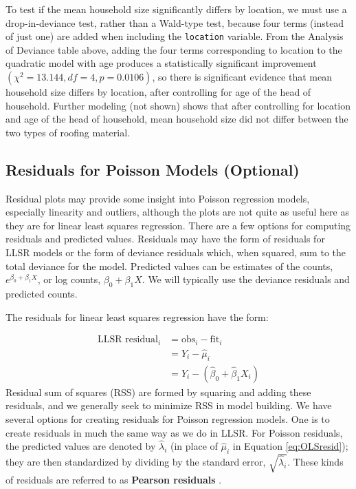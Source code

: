\documentclass[
]{krantz}
\begin{document}
To test if the mean household size significantly differs by location, we must use a drop-in-deviance test, rather than a Wald-type test, because four terms (instead of just one) are added when including the \texttt{location} variable. From the Analysis of Deviance table above, adding the four terms corresponding to location to the quadratic model with age produces a statistically significant improvement \((\chi^2=13.144, df = 4, p=0.0106)\), so there is significant evidence that mean household size differs by location, after controlling for age of the head of household. Further modeling (not shown) shows that after controlling for location and age of the head of household, mean household size did not differ between the two types of roofing material.

\hypertarget{sec-PoisResid}{%
\subsection{Residuals for Poisson Models (Optional)}\label{sec-PoisResid}}

Residual plots may provide some insight into Poisson regression models, especially linearity and outliers, although the plots are not quite as useful here as they are for linear least squares regression. There are a few options for computing residuals and predicted values. Residuals may have the form of residuals for LLSR models or the form of deviance residuals which, when squared, sum to the total deviance for the model. Predicted values can be estimates of the counts, \(e^{\beta_0+\beta_1X}\), or log counts, \(\beta_0+\beta_1X\). We will typically use the deviance residuals and predicted counts.

The residuals for linear least squares regression have the form:

\begin{align}
 \textrm{LLSR residual}_i  &= \textrm{obs}_i - \textrm{fit}_i \nonumber \\
&={Y_i-\hat{\mu}_i} \nonumber \\
 &= Y_i-(\hat{\beta}_0 +\hat{\beta}_1 X_i)
\label{eq:OLSresid}
 \end{align}
Residual sum of squares (RSS) are formed by squaring and adding these residuals, and we generally seek to minimize RSS in model building. We have several options for creating residuals for Poisson regression models. One is to create residuals in much the same way as we do in LLSR. For Poisson residuals, the predicted values are denoted by \(\hat{\lambda}_i\) (in place of \(\hat{\mu}_i\) in Equation \eqref{eq:OLSresid}); they are then standardized by dividing by the standard error, \(\sqrt{\hat{\lambda}_i}\). These kinds of residuals are referred to as \textbf{Pearson residuals} .
\end{document}
